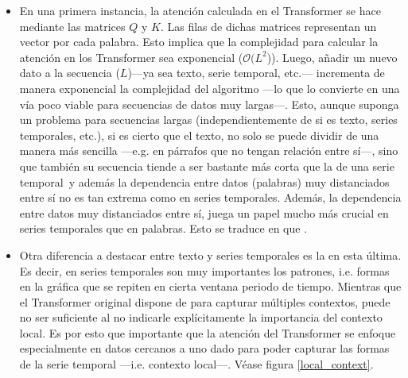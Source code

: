 \begin{itemize}
    \item En una primera instancia, la atención calculada en el Transformer se hace mediante las matrices $Q$ y $K$. Las filas de dichas matrices representan un vector por cada palabra. Esto implica que la complejidad  para  calcular la atención en los Transformer sea exponencial ($\mathcal{O}(L^2$)). Luego, añadir un nuevo dato a la secuencia ($L$)---ya sea texto, serie temporal, etc.--- incrementa de manera exponencial la complejidad del algoritmo ---lo que lo convierte en una vía poco viable para secuencias de  datos muy largas---. Esto, aunque suponga un problema para secuencias largas (independientemente de si es texto, series temporales, etc.), si es cierto que el texto, no solo se puede dividir de una manera más sencilla ---e.g. en párrafos que no tengan relación entre sí---, sino que también su secuencia tiende a ser bastante más corta que la de una serie temporal\fnm\ y además la dependencia entre datos (palabras) muy distanciados entre sí no es tan extrema como en series temporales. Además, la dependencia entre datos muy distanciados entre sí, juega un papel mucho más crucial en series temporales que en palabras\fnm. Esto se traduce en que  \parencite{surveyTransfTS}.
    \addtocounter{footnote}{1}
    \item Otra diferencia a destacar entre texto y series temporales es la  en esta última. Es decir, en series temporales son muy importantes los patrones, i.e. formas en la gráfica que se repiten en cierta ventana periodo de tiempo. Mientras que el Transformer original dispone de  para capturar múltiples contextos, puede no ser suficiente al no indicarle explícitamente la importancia del contexto local. Es por esto que importante que la atención del Transformer se enfoque especialmente en datos cercanos a uno dado  para poder capturar las formas de la serie temporal ---i.e. contexto local---. Véase figura \ref{local_context}.

\end{itemize}

